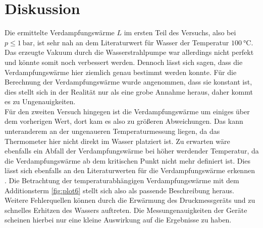 \section{Diskussion}

Die ermittelte Verdampfungswärme $L$ im ersten Teil des Versuchs, also bei $p \leq \SI{1}{\bar}$, ist sehr nah an dem Literaturwert \cite{Verdampfungswärme} für Wasser der Temperatur $\SI{100}{\celsius}$.
Das erzeugte Vakuum durch die Wasserstrahlpumpe war allerdings nicht perfekt und könnte somit noch verbessert werden. Dennoch lässt sich sagen, dass die Verdampfungswärme hier ziemlich genau bestimmt werden
konnte. Für die Berechnung der Verdampfungswärme wurde angenommen, dass sie konstant ist, dies stellt
sich in der Realität nur als eine grobe Annahme heraus, daher kommt es zu Ungenauigkeiten.
\newline
\\
Für den zweiten Versuch hingegen ist die Verdampfungswärme um einiges über dem vorherigen Wert, dort kam es also zu größeren Abweichungen. Das kann unteranderem an 
der ungenaueren Temperaturmessung liegen, da das Thermometer hier nicht direkt im Wasser platziert ist. Zu erwarten wäre ebenfalls ein Abfall der Verdampfungswärme bei höher werdender
Temperatur, da die Verdampfungswärme ab dem kritischen Punkt nicht mehr definiert ist. Dies lässt sich ebenfalls an den Literaturwerten für die Verdampfungswärme erkennen \cite{Verdampfungswärme}. Die Betrachtung der temperaturabhängigen Verdampfungswärme mit dem Additionsterm \ref{fig:plot6} stellt sich also als passende Beschreibung heraus.
\newline
\\
Weitere Fehlerquellen können durch die Erwärmung des Druckmessgeräts und zu schnelles Erhitzen des Wassers auftreten. Die Messungenauigkeiten der Geräte scheinen hierbei nur eine kleine Auswirkung auf die Ergebnisse zu haben. 
